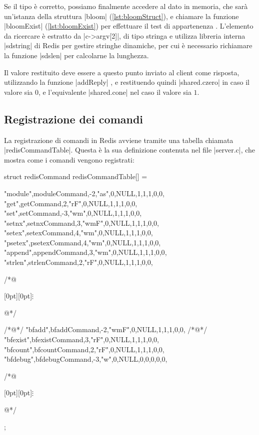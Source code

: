 Se il tipo è corretto, possiamo finalmente accedere al dato in memoria, che sarà un'istanza della
struttura \cverb|bloom| (\autoref{lst:bloomStruct}), e chiamare la funzione  \cverb|bloomExist|
(\autoref{lst:bloomExist}) per effettuare il test di appartenenza . L'elemento da ricercare
è estratto da \cverb|c->argv[2]|, di tipo stringa e utilizza libreria interna \cverb|sdstring| di
Redis per gestire stringhe dinamiche, per cui è necessario richiamare la funzione \cverb|sdslen| per
calcolarne la lunghezza.

Il valore restituito deve essere a questo punto inviato al client come risposta, utilizzando
la funzione \cverb|addReply| , e restituendo quindi \cverb|shared.czero| in caso il valore
sia $0$, e l'equivalente \cverb|shared.cone| nel caso il valore sia $1$.

\subsection{Registrazione dei comandi}

La registrazione di comandi in Redis avviene tramite una tabella chiamata \cverb|redisCommandTable|.
Questa è la sua definizione contenuta nel file \cverb|server.c|, che mostra come i comandi vengono
registrati:

\begin{commentedsource}[style=csource,caption=Registrazione nuovi comandi nella tabella co\-man\-di,label={lst:cmdtable}]
struct redisCommand redisCommandTable[] = {
    {"module",moduleCommand,-2,"as",0,NULL,1,1,1,0,0},
    {"get",getCommand,2,"rF",0,NULL,1,1,1,0,0},
    {"set",setCommand,-3,"wm",0,NULL,1,1,1,0,0},
    {"setnx",setnxCommand,3,"wmF",0,NULL,1,1,1,0,0},
    {"setex",setexCommand,4,"wm",0,NULL,1,1,1,0,0},
    {"psetex",psetexCommand,4,"wm",0,NULL,1,1,1,0,0},
    {"append",appendCommand,3,"wm",0,NULL,1,1,1,0,0},
    {"strlen",strlenCommand,2,"rF",0,NULL,1,1,1,0,0},

/*@\centerline{\raisebox{-1pt}[0pt][0pt]{$\vdots$}}@*/

/*@\lnote@*/    {"bfadd",bfaddCommand,-2,"wmF",0,NULL,1,1,1,0,0},
/*@\lnote@*/    {"bfexist",bfexistCommand,3,"rF",0,NULL,1,1,1,0,0},
    {"bfcount",bfcountCommand,2,"rF",0,NULL,1,1,1,0,0},
    {"bfdebug",bfdebugCommand,-3,"w",0,NULL,0,0,0,0,0},

/*@\centerline{\raisebox{-1pt}[0pt][0pt]{$\vdots$}}@*/

};
\end{commentedsource}

